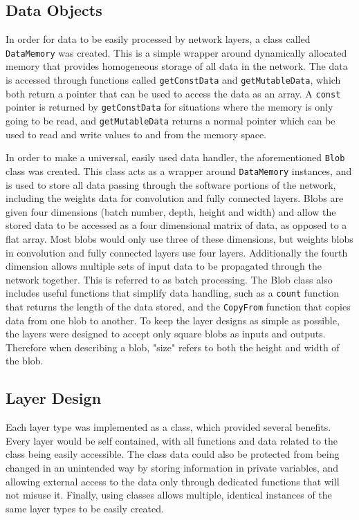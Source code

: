 \documentclass[12pt]{article}
\begin{document}
\subsection{Data Objects}
\label{sec:Design-Network-Blobs}

In order for data to be easily processed by network layers, a class called \lstinline|DataMemory| was created. This is a simple wrapper around dynamically allocated memory that provides homogeneous storage of all data in the network. The data is accessed through functions called \lstinline|getConstData| and \lstinline|getMutableData|, which both return a pointer that can be used to access the data as an array. A \lstinline|const| pointer is returned by \lstinline|getConstData| for situations where the memory is only going to be read, and \lstinline|getMutableData| returns a normal pointer which can be used to read and write values to and from the memory space.

In order to make a universal, easily used data handler, the aforementioned \lstinline|Blob| class was created. This class acts as a wrapper around \lstinline|DataMemory| instances, and is used to store all data passing through the software portions of the network, including the weights data for convolution and fully connected layers. Blobs are given four dimensions (batch number, depth, height and width) and allow the stored data to be accessed as a four dimensional matrix of data, as opposed to a flat array. Most blobs would only use three of these dimensions, but weights blobs in convolution and fully connected layers use four layers. Additionally the fourth dimension allows multiple sets of input data to be propagated through the network together. This is referred to as batch processing. The Blob class also includes useful functions that simplify data handling, such as a \lstinline|count| function that returns the length of the data stored, and the \lstinline|CopyFrom| function that copies data from one blob to another. To keep the layer designs as simple as possible, the layers were designed to accept only square blobs as inputs and outputs. Therefore when describing a blob, "size" refers to both the height and width of the blob.

\subsection{Layer Design}
\label{sec:Design-Network-Layers}

Each layer type was implemented as a class, which provided several benefits. Every layer would be self contained, with all functions and data related to the class being easily accessible. The class data could also be protected from being changed in an unintended way by storing information in private variables, and allowing external access to the data only through dedicated functions that will not misuse it. Finally, using classes allows multiple, identical instances of the same layer types to be easily created.
\end{document}
